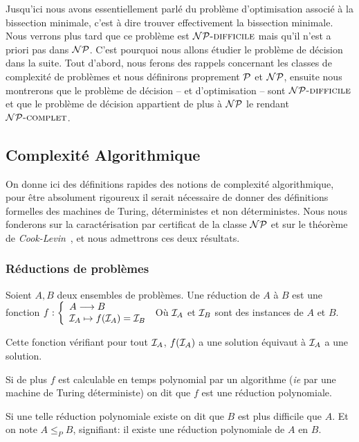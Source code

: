 \documentclass{standalone}
\begin{document}
	
Jusqu'ici nous avons essentiellement parlé du problème d'optimisation associé à la bissection minimale, c'est à dire trouver effectivement la bissection minimale. Nous verrons plus tard que ce problème est $\mathcal{NP}\text{\textsc{-difficile}}$ mais qu'il n'est a priori pas dans $\mathcal{NP}$. C'est pourquoi nous allons étudier le problème de décision dans la suite. Tout d'abord, nous ferons des rappels concernant les classes de complexité de problèmes et nous définirons proprement $\mathcal{P}$ et $\mathcal{NP}$, ensuite nous montrerons que le problème de décision -- et d'optimisation -- sont $\mathcal{NP}\text{\textsc{-difficile}}$ et que le problème de décision appartient de plus à $\mathcal{NP}$ le rendant $\mathcal{NP}\text{\textsc{-complet}}$.

\subsection{Complexité Algorithmique}

On donne ici des définitions rapides des notions de complexité algorithmique, pour être absolument rigoureux il serait nécessaire de donner des définitions formelles des machines de Turing, déterministes et non déterministes. Nous nous fonderons sur la caractérisation par certificat de la classe $\mathcal{NP}$ et sur le théorème de \emph{Cook-Levin}~\cite{cook}, et nous admettrons ces deux résultats.

\subsubsection{Réductions de problèmes}
\begin{defn}
	Soient $A, B$ deux ensembles de problèmes. Une réduction de $A$ à $B$ est une fonction $f: \left\{ \begin{array}{l}
	A \longrightarrow B \\
	\mathcal I_A \mapsto f(\mathcal I_A) = \mathcal I_B
	\end{array}\right.$
	Où $\mathcal I_A$ et $\mathcal I_B$ sont des instances de $A$ et $B$.
	
	Cette fonction vérifiant pour tout $\mathcal I_A$, $f(\mathcal I_A)$ a une solution équivaut à $\mathcal I_A$ a une solution.
	
	Si de plus $f$ est calculable en temps polynomial par un algorithme (\textit{ie} par une machine de Turing déterministe) on dit que $f$ est une réduction polynomiale.
\end{defn}

\begin{defn}
	Si une telle réduction polynomiale existe on dit que $B$ est plus difficile que $A$. Et on note $A \leq_P B$, signifiant: il existe une réduction polynomiale de $A$ en $B$.
\end{defn}
\end{document}
